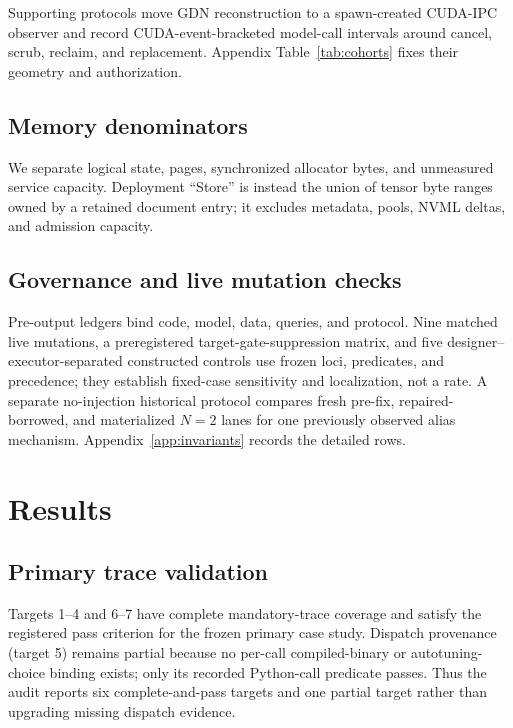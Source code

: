 \documentclass{article}
\begin{document}
Supporting protocols move GDN reconstruction to a spawn-created CUDA-IPC
observer and record CUDA-event-bracketed model-call intervals around cancel,
scrub, reclaim, and replacement.  Appendix Table~\ref{tab:cohorts} fixes their
geometry and authorization.

\subsection{Memory denominators}
\label{sec:denominators}

We separate logical state, pages, synchronized allocator bytes, and unmeasured
service capacity.  Deployment ``Store'' is instead the union of tensor byte
ranges owned by a retained document entry; it excludes metadata, pools, NVML
deltas, and admission capacity.

\subsection{Governance and live mutation checks}

Pre-output ledgers bind code, model, data, queries, and protocol.  Nine matched
live mutations, a preregistered target-gate-suppression matrix, and five
designer--executor-separated constructed controls use frozen loci, predicates,
and precedence; they establish fixed-case sensitivity and localization, not a
rate.  A separate no-injection historical protocol compares fresh pre-fix,
repaired-borrowed, and materialized $N=2$ lanes for one previously observed
alias mechanism.  Appendix~\ref{app:invariants} records the detailed rows.

\section{Results}
\label{sec:results}

\subsection{Primary trace validation}
\label{sec:target-status}

Targets 1--4 and 6--7 have complete mandatory-trace coverage and satisfy the
registered pass criterion for the frozen primary case study.  Dispatch
provenance (target 5) remains partial because no per-call compiled-binary or
autotuning-choice binding exists; only its recorded Python-call predicate
passes.  Thus the audit reports six complete-and-pass targets and one partial
target rather than upgrading missing dispatch evidence.
\end{document}
